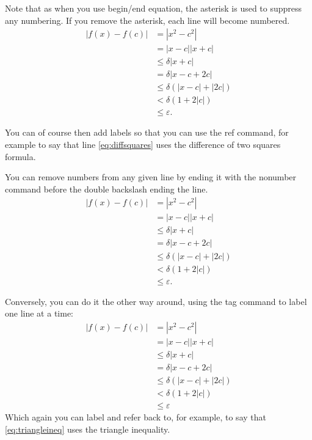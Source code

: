 \documentclass[a4paper,11pt]{article}
\begin{document}
Note that as when you use begin/end equation, the asterisk is used to suppress any numbering. If you remove the asterisk, each line will become numbered.
\begin{align} 
|f(x)-f(c)| & =    |x^2-c^2| \\
            & =    |x-c||x+c|       \label{eq:diffsquares} \\
            & \leq \delta |x+c|    \\                  
            & =    \delta |x-c+2c| \\
            & \leq \delta \left( |x-c|+|2c| \right)  \\
            & <    \delta \left( 1+2|c|\right )      \\
            & \leq \varepsilon.                     
\end{align}

You can of course then add labels so that you can use the ref command, for example to say that line \ref{eq:diffsquares} uses the difference of two squares formula.
 
You can remove numbers from any given line by ending it with the nonumber command before the double backslash ending the line.
\begin{align} 
|f(x)-f(c)| & =    |x^2-c^2|     \nonumber \\
            & =    |x-c||x+c|      \nonumber  \\
            & \leq \delta |x+c|    \\                  
            & =    \delta |x-c+2c| \\
            & \leq \delta \left( |x-c|+|2c| \right)   \nonumber \\
            & <    \delta \left( 1+2|c|\right )      \\
            & \leq \varepsilon.                       
\end{align}

Conversely, you can do it the other way around, using the tag command to label one line at a time:
\begin{align*} 
|f(x)-f(c)| & =    |x^2-c^2| \\                
            & =    |x-c||x+c|     \\           
            & \leq \delta |x+c|    \\                  
            & =    \delta |x-c+2c| \\
            & \leq \delta \left( |x-c|+|2c| \right)   \tag{\ddag}\label{eq:triangleineq}  \\
            & <    \delta \left( 1+2|c|\right )      \\
            & \leq \varepsilon                       
\end{align*}
Which again you can label and refer back to, for example, to say that  \eqref{eq:triangleineq} uses the triangle inequality. 
\end{document}
